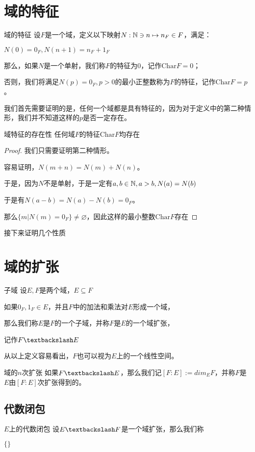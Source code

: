 \documentclass[12pt, a4paper, oneside, UTF8]{ctexbook}
\begin{document}
	\section{域的特征}
		\begin{defn}{域的特征}{}
			设$F$是一个域，定义以下映射$N:\mathbb{N} \ni n \mapsto n_F \in F$，满足：
			
			$N(0)=0_F,N(n+1)=n_F+1_F$
			
			那么，如果$N$是一个单射，我们称$F$的特征为$0$，记作$\text{Char} F=0$；
			
			否则，我们将满足$N(p)=0_F,p > 0$的最小正整数称为$F$的特征，记作$\text{Char} F = p$。
		\end{defn}
		我们首先需要证明的是，任何一个域都是具有特征的，因为对于定义中的第二种情形，我们并不知道这样的$p$是否一定存在。
		\begin{them}{域特征的存在性}{}
			任何域$F$的特征$\text{Char} F$均存在
		\end{them}
		\begin{proof}
			我们只需要证明第二种情形。
			
			容易证明，$N(m+n)=N(m)+N(n)$。
			
			于是，因为$N$不是单射，于是一定有$a,b\in \mathbb{N} ,a > b,N(a)=N(b)$
			
			于是有$N(a-b)=N(a)-N(b)=0_F$。
			
			那么$\{m|N(m)=0_F\}\neq \varnothing$，因此这样的最小整数$\text{Char}F$存在
		\end{proof}
		接下来证明几个性质
		\begin{proposition}
			
		\end{proposition}
		
	\section{域的扩张}
		\begin{defn}{子域}{}
			设$E,F$是两个域，$E \subseteq F$
			
			如果$0_F,1_F \in E$，并且$F$中的加法和乘法对$E$形成一个域，
			
			那么我们称$E$是$F$的一个子域，并称$F$是$E$的一个域扩张，
			
			记作$F\textbackslash E$
		\end{defn}
		从以上定义容易看出，$F$也可以视为$E$上的一个线性空间。
		\begin{defn}{域的$n$次扩张}{}
			如果$F\textbackslash E$，那么我们记$[F:E]:=dim_E F$，并称$F$是$E$由$[F:E]$次扩张得到的。
		\end{defn}
	\subsection{代数闭包}
		\begin{defn}{$E$上的代数闭包}{}
			设$E \textbackslash F$是一个域扩张，那么我们称
			
			$\{\}$
		\end{defn}
\ifx\allfiles\undefined
\end{document}
